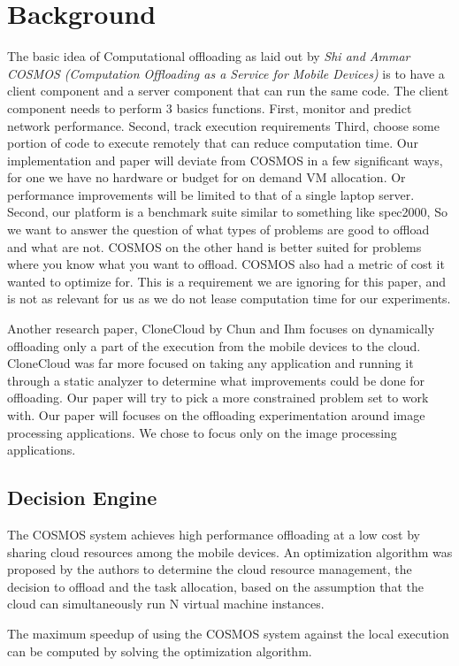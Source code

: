 \documentclass{sig-alternate}
\begin{document}
\section{Background}
The basic idea of Computational offloading as laid out by \textit{Shi and Ammar COSMOS (Computation Offloading as a Service for Mobile Devices)} is to have a client component and a server component that can run the same code.\cite{cosmos} The client component needs to perform 3 basics functions. First, monitor and predict network performance.  Second, track execution requirements Third, choose some portion of code to execute remotely that can reduce computation time. Our implementation and paper will deviate from COSMOS in a few significant ways, for one we have no hardware or budget for on demand VM allocation. Or performance improvements will be limited to that of a single laptop server. Second, our platform is a benchmark suite similar to something like spec2000, So we want to answer the question of what types of problems are good to offload and what are not. COSMOS on the other hand is better suited for problems where you know what you want to offload. COSMOS also had a metric of cost it wanted to optimize for. This is a requirement we are ignoring for this paper, and is not as relevant for us as we do not lease computation time for our experiments.

Another research paper, CloneCloud \cite{clonecloud} by Chun and Ihm focuses on dynamically offloading only a part of the execution from the mobile devices to the cloud. CloneCloud was far more focused on taking any application and running it through a static analyzer to determine what improvements could be done for offloading. Our paper will try to pick a more constrained problem set to work with. Our paper will focuses on the offloading experimentation around image processing applications. We chose to focus only on the image processing applications.

\subsection{Decision Engine}
The COSMOS system achieves high performance offloading at a low cost by sharing cloud resources among the mobile devices. An optimization algorithm was proposed by the authors to determine the cloud resource management, the decision to offload and the task allocation, based on the assumption that the cloud can simultaneously run N virtual machine instances. \cite{cosmos}

The maximum speedup of using the COSMOS system against the local execution can be computed by solving the optimization algorithm.
\end{document}
